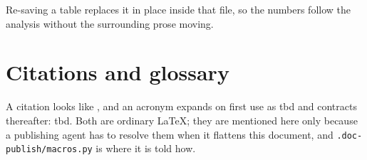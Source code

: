 \documentclass[../../main.tex]{subfiles}
\begin{document}

Re-saving a table replaces it in place inside that file, so the numbers follow
the analysis without the surrounding prose moving.

\section{Citations and glossary}\label{sec:example_conventions}

A citation looks like \textcite{example2024}, and an acronym expands on first use
as \gls{tbd} and contracts thereafter: \gls{tbd}. Both are ordinary LaTeX; they
are mentioned here only because a publishing agent has to resolve them when it
flattens this document, and \texttt{.doc-publish/macros.py} is where it is told
how.
\end{document}
